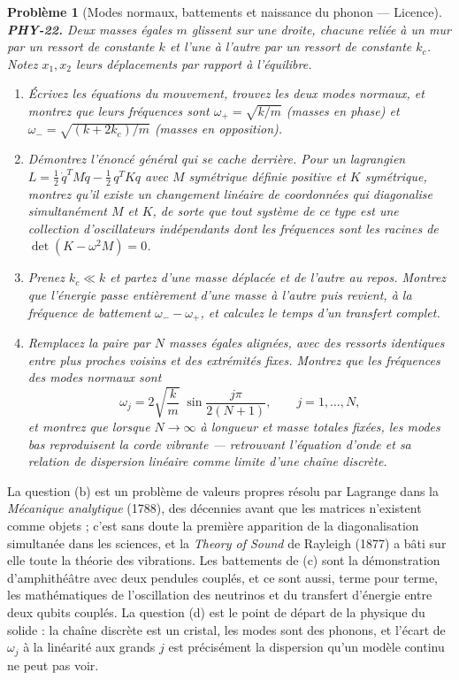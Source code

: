 \documentclass[11pt]{article}
\newtheorem{problem}{Problème}
\begin{document}
\begin{problem}[{Modes normaux, battements et naissance du phonon --- Licence}]
\textbf{PHY-22.} Deux masses égales $m$ glissent sur une droite, chacune reliée à un mur par
un ressort de constante $k$ et l'une à l'autre par un ressort de constante $k_c$. Notez
$x_1, x_2$ leurs déplacements par rapport à l'équilibre.
\begin{enumerate}
\item[(a)] Écrivez les équations du mouvement, trouvez les deux modes normaux, et montrez que leurs
fréquences sont $\omega_+ = \sqrt{k/m}$ (masses en phase) et
$\omega_- = \sqrt{(k + 2k_c)/m}$ (masses en opposition).
\item[(b)] Démontrez l'énoncé général qui se cache derrière. Pour un lagrangien
$L = \tfrac12\,\dot{q}^{T} M \dot{q} - \tfrac12\,q^{T} K q$ avec $M$ symétrique définie
positive et $K$ symétrique, montrez qu'il existe un changement linéaire de coordonnées qui
diagonalise simultanément $M$ et $K$, de sorte que tout système de ce type est une collection
d'oscillateurs indépendants dont les fréquences sont les racines de
$\det(K - \omega^2 M) = 0$.
\item[(c)] Prenez $k_c \ll k$ et partez d'une masse déplacée et de l'autre au repos. Montrez que
l'énergie passe entièrement d'une masse à l'autre puis revient, à la fréquence de battement
$\omega_- - \omega_+$, et calculez le temps d'un transfert complet.
\item[(d)] Remplacez la paire par $N$ masses égales alignées, avec des ressorts identiques entre plus
proches voisins et des extrémités fixes. Montrez que les fréquences des modes normaux sont
\[ \omega_j = 2\sqrt{\frac{k}{m}}\;\sin\frac{j\pi}{2(N+1)}, \qquad j = 1,\dots,N, \]
et montrez que lorsque $N \to \infty$ à longueur et masse totales fixées, les modes bas
reproduisent la corde vibrante --- retrouvant l'équation d'onde et sa relation de dispersion
linéaire comme limite d'une chaîne discrète.
\end{enumerate}

\end{problem}

\noindent La question (b) est un problème de valeurs propres résolu par Lagrange dans la
\textit{Mécanique analytique} (1788), des décennies avant que les matrices n'existent comme objets ;
c'est sans doute la première apparition de la diagonalisation simultanée dans les sciences, et la
\textit{Theory of Sound} de Rayleigh (1877) a bâti sur elle toute la théorie des vibrations. Les
battements de (c) sont la démonstration d'amphithéâtre avec deux pendules couplés, et ce sont
aussi, terme pour terme, les mathématiques de l'oscillation des neutrinos et du transfert
d'énergie entre deux qubits couplés. La question (d) est le point de départ de la physique du
solide : la chaîne discrète est un cristal, les modes sont des phonons, et l'écart de
$\omega_j$ à la linéarité aux grands $j$ est précisément la dispersion qu'un modèle continu ne
peut pas voir.
\end{document}
